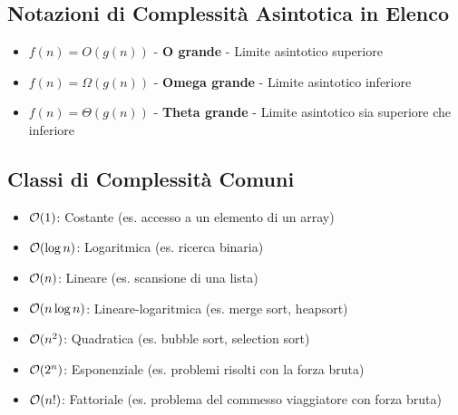 \subsection*{Notazioni di Complessità Asintotica in Elenco}

\begin{itemize}
    \item $f(n) = O(g(n))$ - \textbf{O grande} - Limite asintotico superiore
    \item $f(n) = \Omega(g(n))$ - \textbf{Omega grande} - Limite asintotico inferiore
    \item $f(n) = \Theta(g(n))$ - \textbf{Theta grande} - Limite asintotico sia superiore che inferiore
\end{itemize}

\subsection*{Classi di Complessità Comuni}
\begin{itemize}
    \item $\mathcal{O}(1)$: Costante (es. accesso a un elemento di un array)
    \item $\mathcal{O}(\log n)$: Logaritmica (es. ricerca binaria)
    \item $\mathcal{O}(n)$: Lineare (es. scansione di una lista)
    \item $\mathcal{O}(n \log n)$: Lineare-logaritmica (es. merge sort, heapsort)
    \item $\mathcal{O}(n^2)$: Quadratica (es. bubble sort, selection sort)
    \item $\mathcal{O}(2^n)$: Esponenziale (es. problemi risolti con la forza bruta)
    \item $\mathcal{O}(n!)$: Fattoriale (es. problema del commesso viaggiatore con forza bruta)
\end{itemize}
